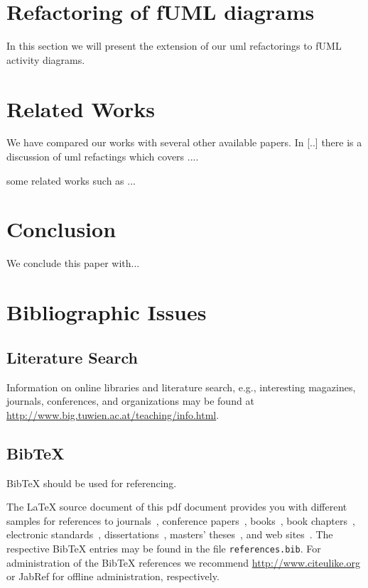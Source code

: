 \documentclass{llncs}
\begin{document}
\section{Refactoring of fUML diagrams}
In this section we will present the extension of our uml refactorings to fUML activity diagrams.

\section{Related Works}
We have compared our works with several other available papers. In [..] there is a discussion of uml refactings which covers ....

some related works such as ...

\section{Conclusion}
We conclude this paper with...

\section{Bibliographic Issues}

\subsection{Literature Search}

Information on online libraries and literature search, e.g., interesting magazines, journals, conferences, and organizations may be found at \url{http://www.big.tuwien.ac.at/teaching/info.html}.

\subsection{BibTeX}

BibTeX should be used for referencing.

The LaTeX source document of this pdf document provides you with different samples for references to journals~\cite{jour:B2BServices}, conference papers~\cite{proc:TheWebMLApproach}, books~\cite{book:umlatwork}, book chapters~\cite{incoll:ErhardKonrad1992}, electronic standards~\cite{man:BPEL}, dissertations~\cite{phdthesis:manuelWimmer}, masters' theses~\cite{mast:AUMLProfile}, and web sites~\cite{misc:BIGWebsite}. The respective BibTeX entries may be found in the file \texttt{references.bib}. For administration of the BibTeX references we recommend \url{http://www.citeulike.org} or JabRef for offline administration, respectively.



\end{document}
